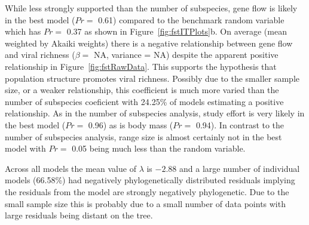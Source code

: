 
While less strongly supported than the number of subspecies, gene flow is likely in the best model ($Pr = $ 0.61) compared to the benchmark random variable which has $Pr = $ 0.37 as shown in Figure~\ref{fig:fstITPlots}b.
On average (mean weighted by Akaiki weights) there is a negative relationship between gene flow and viral richness ($\beta = $ NA, variance = NA) despite the apparent positive relationship in Figure~\ref{fig:fstRawData}.
This supports the hypothesis that population structure promotes viral richness.
Possibly due to the smaller sample size, or a weaker relationship, this coefficient is much more varied than the number of subspecies coeficient with 24.25\% of models estimating a positive relationship.
As in the number of subspecies analysis, study effort is very likely in the best model ($Pr = $ 0.96) as is body mass ($Pr = $ 0.94).
In contrast to the number of subspecies analysis, range size is almost certainly not in the best model with $Pr = $ 0.05 being much less than the random variable.

Across all models the mean value of $\lambda$ is \ensuremath{-2.88} and a large number of individual models (66.58\%)  had negatively phylogenetically distributed residuals implying the residuals from the model are strongly negatively phylogenetic.
Due to the small sample size this is probably due to a small number of data points with large residuals being distant on the tree.










